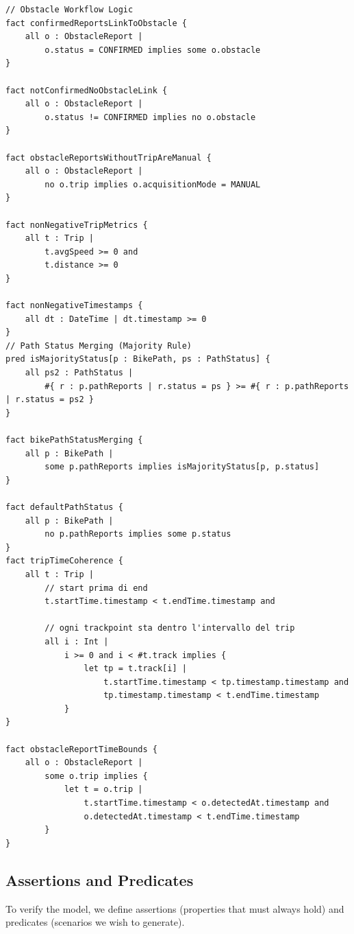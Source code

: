 \begin{lstlisting}[language=Alloy]
// Obstacle Workflow Logic
fact confirmedReportsLinkToObstacle {
    all o : ObstacleReport |
        o.status = CONFIRMED implies some o.obstacle
}

fact notConfirmedNoObstacleLink {
    all o : ObstacleReport |
        o.status != CONFIRMED implies no o.obstacle
}

fact obstacleReportsWithoutTripAreManual {
    all o : ObstacleReport |
        no o.trip implies o.acquisitionMode = MANUAL
}

fact nonNegativeTripMetrics {
    all t : Trip |
        t.avgSpeed >= 0 and
        t.distance >= 0
}

fact nonNegativeTimestamps {
    all dt : DateTime | dt.timestamp >= 0
}
// Path Status Merging (Majority Rule)
pred isMajorityStatus[p : BikePath, ps : PathStatus] {
    all ps2 : PathStatus |
        #{ r : p.pathReports | r.status = ps } >= #{ r : p.pathReports | r.status = ps2 }
}

fact bikePathStatusMerging {
    all p : BikePath |
        some p.pathReports implies isMajorityStatus[p, p.status]
}

fact defaultPathStatus {
    all p : BikePath |
        no p.pathReports implies some p.status
}
fact tripTimeCoherence {
    all t : Trip |
        // start prima di end
        t.startTime.timestamp < t.endTime.timestamp and

        // ogni trackpoint sta dentro l'intervallo del trip
        all i : Int |
            i >= 0 and i < #t.track implies {
                let tp = t.track[i] |
                    t.startTime.timestamp < tp.timestamp.timestamp and
                    tp.timestamp.timestamp < t.endTime.timestamp
            }
}

fact obstacleReportTimeBounds {
    all o : ObstacleReport |
        some o.trip implies {
            let t = o.trip |
                t.startTime.timestamp < o.detectedAt.timestamp and
                o.detectedAt.timestamp < t.endTime.timestamp
        }
}
\end{lstlisting}

\subsection{Assertions and Predicates}
\par
To verify the model, we define assertions (properties that must always hold) and predicates (scenarios we wish to generate).


